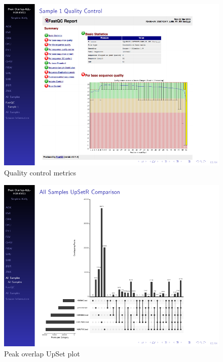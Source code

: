 \documentclass[final]{beamer}
\newlength{\onecolwid}
\newlength{\twocolwid}
\begin{document}
\begin{frame}[t]
\begin{columns}[t]
\begin{column}{\twocolwid}
\begin{columns}[t,totalwidth=\twocolwid]
\begin{column}{\onecolwid}
\begin{beamerboxesrounded}{}
\begin{figure} %
\includegraphics[width=1.0\linewidth, frame]{./Figures/fastqc_report}
\caption{Quality control metrics}
\label{fig:fingerprint}
\end{figure}


\begin{figure}
\includegraphics[width=1.0\linewidth, frame]{./Figures/peaks_UpSetR}
\caption{Peak overlap UpSet plot}
\label{fig:five_way_venn}
\end{figure}


\end{beamerboxesrounded}\hfill


\end{column} %


\end{columns}
\end{column}
\end{columns}
\end{frame}
\end{document}
